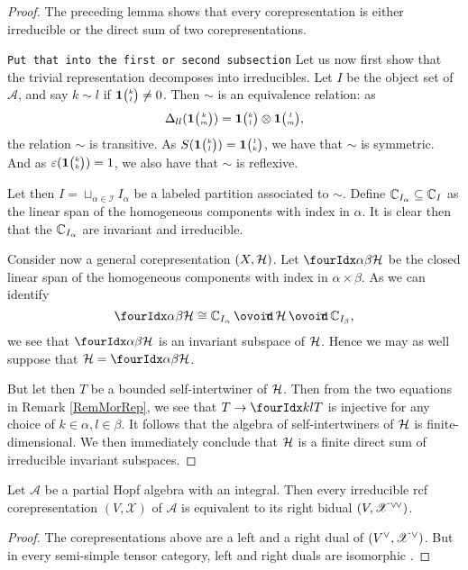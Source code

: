 \begin{proof} 
The preceding lemma shows that  every corepresentation is either
irreducible or the direct sum of two corepresentations. 

\texttt{Put that into the first or second subsection}
Let us now first show that the trivial representation decomposes into irreducibles. Let $I$ be the object set of $\mathscr{A}$, and say $k\sim l$ if $\mathbf{1}{\tiny {\begin{pmatrix} k\\l\end{pmatrix}}}\neq 0$. Then $\sim$ is an equivalence relation: as \[\Delta_{ll}(\mathbf{1}{\tiny {\begin{pmatrix} k\\m\end{pmatrix}}}) = \mathbf{1}{\tiny {\begin{pmatrix} k\\l\end{pmatrix}}}\otimes \mathbf{1}{\tiny {\begin{pmatrix} l\\m\end{pmatrix}}},\] the relation $\sim$ is transitive. As $S(\mathbf{1}{\tiny {\begin{pmatrix} k\\l\end{pmatrix}}}) = \mathbf{1}{\tiny {\begin{pmatrix} l\\k\end{pmatrix}}}$, we have that $\sim$ is symmetric. And as $\varepsilon(\mathbf{1}{\tiny {\begin{pmatrix} k\\k\end{pmatrix}}})=1$, we also have that $\sim$ is reflexive. 

Let then $I = \sqcup_{\alpha\in \mathscr{I}} I_{\alpha}$ be a labeled partition associated to $\sim$. Define $\mathbb{C}_{I_{\alpha}}\subseteq \mathbb{C}_I$ as the linear span of the homogeneous components with index in $\alpha$. It is clear then that the $\mathbb{C}_{I_{\alpha}}$ are invariant and irreducible.

Consider now a general corepresentation $(X,\mathcal{H})$. Let $\Grd{\Hsp}{\alpha}{\beta}$ be the closed linear span of the homogeneous components with index in $\alpha\times \beta$. As we can identify \[\Grd{\Hsp}{\alpha}{\beta} \cong \C_{I_{\alpha}}\,\Circt\, \Hsp\,\Circt\, \C_{I_{\beta}},\] we see that $\Grd{\Hsp}{\alpha}{\beta}$ is an invariant subspace of $\mathcal{H}$. Hence we may as well suppose that $\Hsp = \Grd{\Hsp}{\alpha}{\beta}$. 

But let then $T$ be a bounded self-intertwiner of $\mathcal{H}$. Then from the two equations in Remark \ref{RemMorRep}, we see that $T\rightarrow \Gru{T}{k}{l}$ is injective for any choice of $k\in \alpha,l\in \beta$. It follows that the algebra of self-intertwiners of $\mathcal{H}$ is finite-dimensional. We then immediately conclude that $\mathcal{H}$ is a finite direct sum of irreducible invariant subspaces.
\end{proof} 

\begin{Cor} \label{cor:rep-irreducible-bidual}
  Let $\mathscr{A}$ be a partial Hopf algebra with an integral. Then
  every irreducible rcf corepresentation $(V,\mathscr{X})$ of
  $\mathscr{A}$ is equivalent to its right bidual
  $(V,\mathscr{X}^{\vee}{}\!^{\vee})$.
\end{Cor}
\begin{proof}
  The corepresentations above are a left and a right dual of
  $(V^{\vee},\mathscr{X}^{\vee})$. But in every semi-simple tensor
  category, left and right duals are isomorphic \cite{}. 
\end{proof}

